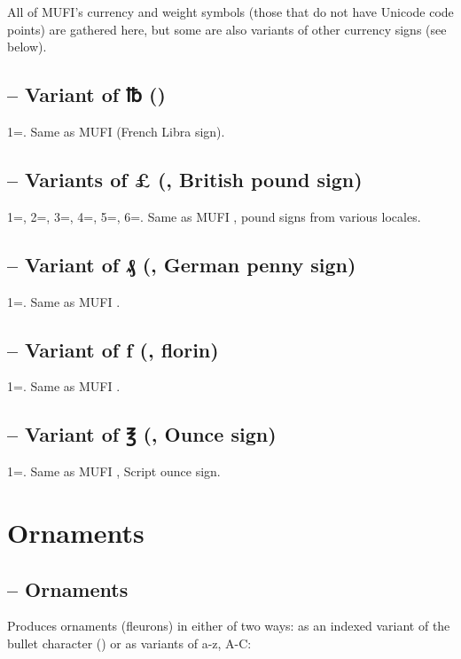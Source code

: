 \noindent All of MUFI’s currency and weight symbols (those that do
not have Unicode code points) are gathered here, but some are also variants of other currency signs (see below).

\subsection{ – Variant of ℔ ()}
1=. Same as MUFI  (French Libra sign).

\subsection{ – Variants of {\pounds} (, British pound sign)}
1=, 2=, 3=, 4=,
5=, 6=. Same as MUFI , pound signs from various locales.

\subsection{ – Variant of ₰ (, German penny sign)}
1=. Same as MUFI .

\subsection{ – Variant of ƒ (, florin)}
1=. Same as MUFI .

\subsection{ – Variant of ℥ (, Ounce sign)}
1=. Same as MUFI , Script ounce sign.

\section{Ornaments}
\subsection{ – Ornaments}\hypertarget{ornm}{}
Produces ornaments (fleurons) in either of two ways: as an indexed variant of the bullet character () or as
variants of a-z, A-C:

